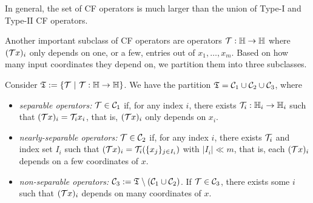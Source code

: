 In general, the set of CF operators is much larger than the union of Type-I and Type-II CF operators.

Another important subclass of CF operators are operators ${\mathcal{T}}:\mathbb{H}\to\mathbb{H}$ where   $({\mathcal{T}} x)_i$ only depends on one, or a few, entries out of $x_1,\ldots,x_m$. Based on how many input coordinates they depend on, we partition them into three subclasses.
 \DIFdelbegin %

\DIFdelend \begin{definition}\label{def:sep-op} Consider $\mathfrak{T}:=\{{\mathcal{T}} ~|~{\mathcal{T}}:\mathbb{H}\to\mathbb{H}\}$. We have the partition $\mathfrak{T}={\mathcal{C}}_1\cup{\mathcal{C}}_2\cup{\mathcal{C}}_3$, where
\begin{itemize}
\item \emph{separable operators:} ${\mathcal{T}}\in{\mathcal{C}}_1$ if, for any index $i$, there exists ${\mathcal{T}}_i: \mathbb{H}_i \rightarrow \mathbb{H}_i$ such that $({\mathcal{T}} x)_i = {\mathcal{T}}_i x_i$, that is,   $({\mathcal{T}} x)_i$ only depends on $x_i$.
\item \emph{nearly-separable operators:} ${\mathcal{T}}\in {\mathcal{C}}_2$ if, for any index $i$, there exists ${\mathcal{T}}_i$ and index set $I_i$ such that $({\mathcal{T}} x)_i = {\mathcal{T}}_i(\{x_j\}_{j\in I_i})$ with $|I_i| \ll m$, that is, each $({\mathcal{T}} x)_i$ depends on a few  coordinates of $x$.
\item \emph{non-separable operators:} ${\mathcal{C}}_3:=\mathfrak{T}\setminus({\mathcal{C}}_1\cup {\mathcal{C}}_2)$. If ${\mathcal{T}}\in{\mathcal{C}}_3$, there exists some  $i$ such that $({\mathcal{T}} x)_i$ depends on many coordinates of $x$.
\end{itemize}
\end{definition}


